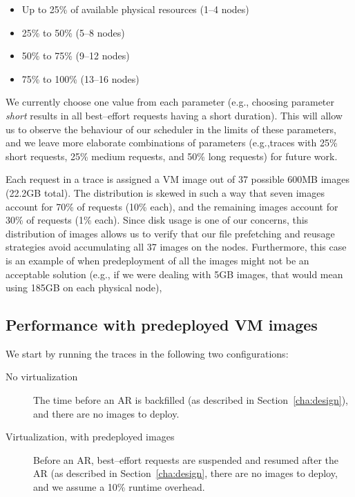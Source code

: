 \begin{description}
\begin{itemize}
\item Up to 25\% of available physical resources (1--4 nodes)
\item 25\% to 50\% (5--8 nodes)
\item 50\% to 75\% (9--12 nodes)
\item 75\% to 100\% (13--16 nodes)
\end{itemize}
\end{description}

We currently choose one value from each parameter (e.g., choosing parameter \emph{short} results in all best--effort requests having a short duration). This will allow us to observe the behaviour of our scheduler in the limits of these parameters, and we leave more elaborate combinations of parameters (e.g.,traces with 25\% short requests, 25\% medium requests, and 50\% long requests) for future work.

Each request in a trace is assigned a VM image out of 37 possible 600MB images (22.2GB total). The distribution is skewed in such a way that seven images account for 70\% of requests (10\% each), and the remaining images account for 30\% of requests (1\% each). Since disk usage is one of our concerns, this distribution of images allows us to verify that our file prefetching and reusage strategies avoid accumulating all 37 images on the nodes. Furthermore, this case is an example of when predeployment of all the images might not be an acceptable solution (e.g., if we were dealing with 5GB images, that would mean using 185GB on each physical node), 

\subsection{Performance with predeployed VM images}

We start by running the traces in the following two configurations:

\begin{description}
\item[No virtualization] The time before an AR is backfilled (as described in Section~\ref{cha:design}), and there are no images to deploy.
\item[Virtualization, with predeployed images] Before an AR, best--effort requests are suspended and resumed after the AR (as described in Section~\ref{cha:design}, there are no images to deploy, and we assume a 10\% runtime overhead.
\end{description}

